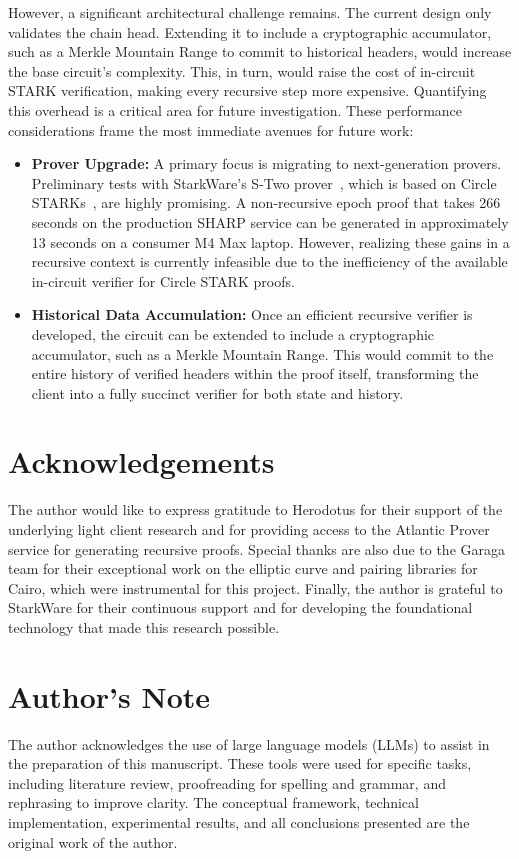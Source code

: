 \documentclass[runningheads]{llncs}
\begin{document}
However, a significant architectural challenge remains. The current design only validates the chain head. Extending it to include a cryptographic accumulator, such as a Merkle Mountain Range to commit to historical headers, would increase the base circuit's complexity. This, in turn, would raise the cost of in-circuit STARK verification, making every recursive step more expensive. Quantifying this overhead is a critical area for future investigation. These performance considerations frame the most immediate avenues for future work:

\begin{itemize}
    \item \textbf{Prover Upgrade:} A primary focus is migrating to next-generation provers. Preliminary tests with StarkWare's S-Two prover~\cite{StarkWare2025STwo}, which is based on Circle STARKs~\cite{Habock2024CircleSTARKs}, are highly promising. A non-recursive epoch proof that takes 266 seconds on the production SHARP service can be generated in approximately 13 seconds on a consumer M4 Max laptop. However, realizing these gains in a recursive context is currently infeasible due to the inefficiency of the available in-circuit verifier for Circle STARK proofs.
    
    \item \textbf{Historical Data Accumulation:} Once an efficient recursive verifier is developed, the circuit can be extended to include a cryptographic accumulator, such as a Merkle Mountain Range. This would commit to the entire history of verified headers within the proof itself, transforming the client into a fully succinct verifier for both state and history.
\end{itemize}

\section*{Acknowledgements}
The author would like to express gratitude to Herodotus for their support of the underlying light client research and for providing access to the Atlantic Prover service for generating recursive proofs. Special thanks are also due to the Garaga team for their exceptional work on the elliptic curve and pairing libraries for Cairo, which were instrumental for this project. Finally, the author is grateful to StarkWare for their continuous support and for developing the foundational technology that made this research possible.

\section*{Author's Note}
The author acknowledges the use of large language models (LLMs) to assist in the preparation of this manuscript. These tools were used for specific tasks, including literature review, proofreading for spelling and grammar, and rephrasing to improve clarity. The conceptual framework, technical implementation, experimental results, and all conclusions presented are the original work of the author.
\end{document}
